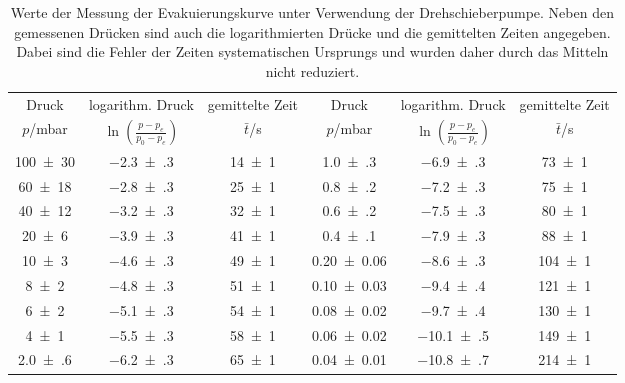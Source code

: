\begin{table}[!h]
	\centering
	\begin{adjustbox}{width=\textwidth}
	\begin{tabular}{cccccc}
		\toprule
		Druck & logarithm. Druck & gemittelte Zeit & Druck & logarithm. Druck & gemittelte Zeit\\
		$p$/\si{mbar} & $\ln(\frac{p-p_e}{p_0-p_e})$ & $\bar{t}$/\si{s} & $p$/\si{mbar} & $\ln(\frac{p-p_e}{p_0-p_e})$ & $\bar{t}$/\si{s}\\
\midrule
		\num{100(30)} & \num{-2.3(3)} & \num{14(1)} & \num{1.0(3)} & \num{-6.9(3)} & \num{73(1)}\\
		\num{60(18)} & \num{-2.8(3)} & \num{25(1)} & \num{0.8(2)} & \num{-7.2(3)} & \num{75(1)}\\
		\num{40(12)} & \num{-3.2(3)} & \num{32(1)} & \num{0.6(2)} & \num{-7.5(3)} & \num{80(1)}\\
		\num{20(6)} & \num{-3.9(3)} & \num{41(1)} & \num{0.4(1)} & \num{-7.9(3)} & \num{88(1)}\\
		\num{10(3)} & \num{-4.6(3)} & \num{49(1)} & \num{0.20(6)} & \num{-8.6(3)} & \num{104(1)}\\
		\num{8(2)} & \num{-4.8(3)} & \num{51(1)} & \num{0.10(3)} & \num{-9.4(4)} & \num{121(1)}\\
		\num{6(2)} & \num{-5.1(3)} & \num{54(1)} & \num{0.08(2)} & \num{-9.7(4)} & \num{130(1)}\\
		\num{4(1)} & \num{-5.5(3)} & \num{58(1)} & \num{0.06(2)} & \num{-10.1(5)} & \num{149(1)}\\
		\num{2.0(6)} & \num{-6.2(3)} & \num{65(1)} & \num{0.04(1)} & \num{-10.8(7)} & \num{214(1)}\\
		\bottomrule
	\end{tabular}
	\end{adjustbox}
	\caption{Werte der Messung der Evakuierungskurve unter Verwendung der Drehschieberpumpe.
                        Neben den gemessenen Drücken sind auch die logarithmierten Drücke und die gemittelten
                        Zeiten angegeben. Dabei sind die Fehler der Zeiten systematischen Ursprungs und wurden 
                        daher durch das Mitteln nicht reduziert. \label{tab:Evakuierungskurve_Drehschieber}}
\end{table}
